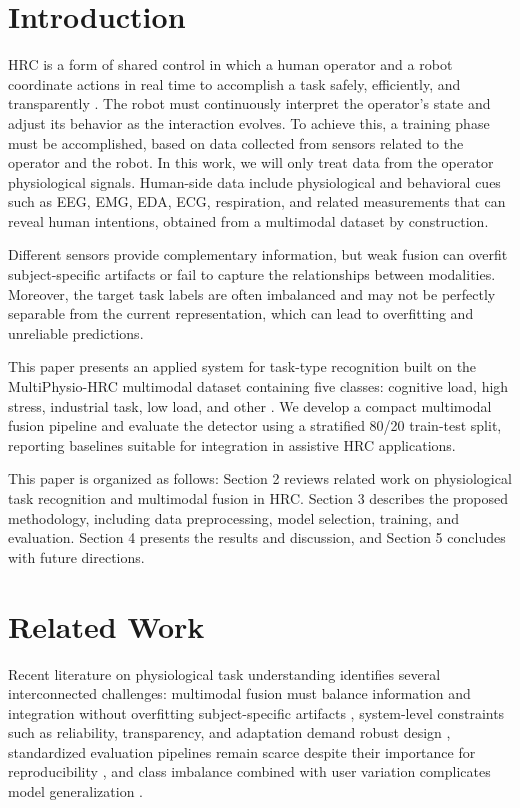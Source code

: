 \documentclass{llncs}
\begin{document}
\section{Introduction}
\Ac{HRC} is a form of shared control in which a human operator and a robot coordinate actions in real time to accomplish a task safely, efficiently, and transparently \cite{selvaggio2021autonomy,thumm2024hrgym}. The robot must continuously interpret the operator's state and adjust its behavior as the interaction evolves. To achieve this, a training phase must be accomplished, based on data collected from sensors related to the operator and the robot. In this work, we will only treat data from the operator physiological signals. Human-side data include physiological and behavioral cues such as \ac{EEG}, \ac{EMG}, \ac{EDA}, \ac{ECG}, respiration, and related measurements that can reveal human intentions, obtained from a multimodal dataset by construction.

Different sensors provide complementary information, but weak fusion can overfit subject-specific artifacts or fail to capture the relationships between modalities. Moreover, the target task labels are often imbalanced and may not be perfectly separable from the current representation, which can lead to overfitting and unreliable predictions.

This paper presents an applied system for task-type recognition built on the MultiPhysio-HRC multimodal dataset containing five classes: cognitive load, high stress, industrial task, low load, and other \cite{bussolan2025multiphysiohrc}. We develop a compact multimodal fusion pipeline and evaluate the detector using a stratified 80/20 train-test split, reporting baselines suitable for integration in assistive \ac{HRC} applications.

This paper is organized as follows: Section 2 reviews related work on physiological task recognition and multimodal fusion in \ac{HRC}. Section 3 describes the proposed methodology, including data preprocessing, model selection, training, and evaluation. Section 4 presents the results and discussion, and Section 5 concludes with future directions.
\section{Related Work}
Recent literature on physiological task understanding identifies several interconnected challenges: multimodal fusion must balance information and integration without overfitting subject-specific artifacts \cite{baltrusaitis2019multimodal}, system-level constraints such as reliability, transparency, and adaptation demand robust design \cite{selvaggio2021autonomy}, standardized evaluation pipelines remain scarce despite their importance for reproducibility \cite{thumm2024hrgym}, and class imbalance combined with user variation complicates model generalization \cite{delange2022continual}. 
\end{document}
